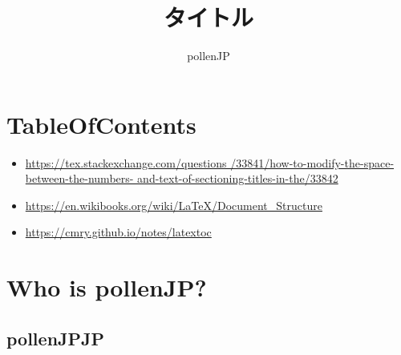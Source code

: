 \documentclass{jsarticle}			%
\title{タイトル}
\author{pollenJP}
\begin{document}
	
	\maketitle
	
	\renewcommand\contentsname{目次（もくじだよ）}
	\tableofcontents
	
	\section{TableOfContents}
		\begin{itemize}
			\item \url{https://tex.stackexchange.com/questions
				/33841/how-to-modify-the-space-between-the-numbers-
				and-text-of-sectioning-titles-in-the/33842
				}
			\item \url{https://en.wikibooks.org/wiki/LaTeX/Document_Structure}
			\item \url{https://cmry.github.io/notes/latextoc}
		\end{itemize}
	
	\section{Who is pollenJP?}
		\subsection{pollenJPJP}
\end{document}
